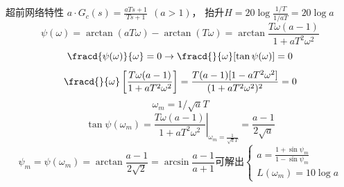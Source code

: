 \documentclass[handout,cjkutf8,table,aspectratio=1610]{beamer} %
\begin{document}
\begin{frame}{超前网络特性}
	$a\cdot G_c(s) = \frac{aTs+1}{Ts+1}~~(a>1)$，
	抬升$H = 20\log \frac{1/T}{1/aT} = 20\log a$
	$$\psi(\omega) = \arctan(aT\omega) - \arctan(T\omega) = \arctan\frac{T\omega(a-1)}{1+aT^2\omega^2}$$
	$$\fracd{\psi(\omega)}{\omega} = 0 \rightarrow \fracd{}{\omega}[\tan\psi(\omega)] = 0$$
	$$\fracd{}{\omega}\left[\frac{T\omega(a-1)}{1+aT^2\omega^2}\right] = \frac{T(a-1)[1-aT^2\omega^2]}{(1+aT^2\omega^2)^2} = 0$$
	$$\omega_m = 1/\sqrt{a}T$$
	$$\tan\psi(\omega_m) = \left.\frac{T\omega(a-1)}{1+aT^2\omega^2}\right|_{\omega_m=\frac{1}{\sqrt{a}T}} = \frac{a-1}{2\sqrt{a}}$$
	$$\psi_m = \psi(\omega_m) = \arctan\frac{a-1}{2\sqrt{2}} = \arcsin\frac{a-1}{a+1}\text{可解出}
	\left\{\begin{array}{l}
		a = \frac{1+\sin\psi_m}{1-\sin\psi_m}\\
		L(\omega_m) = 10\log a
	\end{array}\right.$$
\end{frame}
\end{document}
